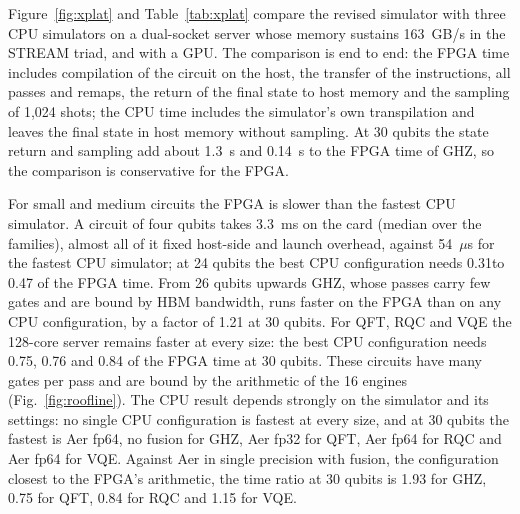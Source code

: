 \documentclass[pdflatex,sn-mathphys-num]{sn-jnl}
\newcommand{\NumCpuTriad}{163}
\newcommand{\NumFlagDtwohGhzThirty}{1.3}
\newcommand{\NumFlagPostGhzThirty}{0.14}
\newcommand{\NumXplatAerRatioGhzThirty}{1.93}
\newcommand{\NumXplatAerRatioQftThirty}{0.75}
\newcommand{\NumXplatAerRatioRqcThirty}{0.84}
\newcommand{\NumXplatAerRatioVqeThirty}{1.15}
\newcommand{\NumXplatBestCpuGhzThirty}{Aer fp64, no fusion}
\newcommand{\NumXplatBestCpuQftThirty}{Aer fp32}
\newcommand{\NumXplatBestCpuRqcThirty}{Aer fp64}
\newcommand{\NumXplatBestCpuVqeThirty}{Aer fp64}
\newcommand{\NumXplatCpuSmallUs}{54}
\newcommand{\NumXplatFpgaSmallMs}{3.3}
\newcommand{\NumXplatGhzCrossN}{26}
\newcommand{\NumXplatRatioGhzThirty}{1.21}
\newcommand{\NumXplatRatioQftThirty}{0.75}
\newcommand{\NumXplatRatioRqcThirty}{0.76}
\newcommand{\NumXplatRatioTwentyFourMax}{0.47}
\newcommand{\NumXplatRatioTwentyFourMin}{0.31}
\newcommand{\NumXplatRatioVqeThirty}{0.84}
\theoremstyle{thmstyleone}
\theoremstyle{thmstylethree}
\begin{document}
Figure~\ref{fig:xplat} and Table~\ref{tab:xplat} compare the revised simulator with three CPU simulators on a dual-socket server whose memory sustains \NumCpuTriad~GB/s in the STREAM triad, and with a GPU. The comparison is end to end: the FPGA time includes compilation of the circuit on the host, the transfer of the instructions, all passes and remaps, the return of the final state to host memory and the sampling of 1{,}024 shots; the CPU time includes the simulator's own transpilation and leaves the final state in host memory without sampling. At 30 qubits the state return and sampling add about \NumFlagDtwohGhzThirty~s and \NumFlagPostGhzThirty~s to the FPGA time of GHZ, so the comparison is conservative for the FPGA.

For small and medium circuits the FPGA is slower than the fastest CPU simulator. A circuit of four qubits takes \NumXplatFpgaSmallMs~ms on the card (median over the families), almost all of it fixed host-side and launch overhead, against \NumXplatCpuSmallUs~$\mu$s for the fastest CPU simulator; at 24 qubits the best CPU configuration needs \NumXplatRatioTwentyFourMin to \NumXplatRatioTwentyFourMax{} of the FPGA time. From \NumXplatGhzCrossN{} qubits upwards GHZ, whose passes carry few gates and are bound by HBM bandwidth, runs faster on the FPGA than on any CPU configuration, by a factor of \NumXplatRatioGhzThirty{} at 30 qubits. For QFT, RQC and VQE the 128-core server remains faster at every size: the best CPU configuration needs \NumXplatRatioQftThirty, \NumXplatRatioRqcThirty{} and \NumXplatRatioVqeThirty{} of the FPGA time at 30 qubits. These circuits have many gates per pass and are bound by the arithmetic of the 16 engines (Fig.~\ref{fig:roofline}). The CPU result depends strongly on the simulator and its settings: no single CPU configuration is fastest at every size, and at 30 qubits the fastest is \NumXplatBestCpuGhzThirty{} for GHZ, \NumXplatBestCpuQftThirty{} for QFT, \NumXplatBestCpuRqcThirty{} for RQC and \NumXplatBestCpuVqeThirty{} for VQE. Against Aer in single precision with fusion, the configuration closest to the FPGA's arithmetic, the time ratio at 30 qubits is \NumXplatAerRatioGhzThirty{} for GHZ, \NumXplatAerRatioQftThirty{} for QFT, \NumXplatAerRatioRqcThirty{} for RQC and \NumXplatAerRatioVqeThirty{} for VQE.
\end{document}
